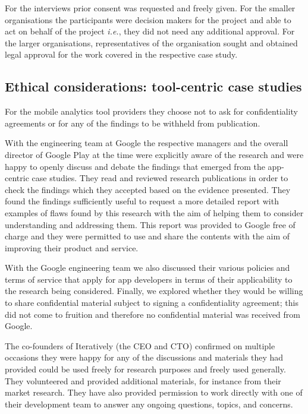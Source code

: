 For the interviews prior consent was requested and freely given. For the smaller organisations the participants were decision makers for the project and able to act on behalf of the project \textit{i.e.}, they did not need any additional approval. For the larger organisations, representatives of the organisation sought and obtained legal approval for the work covered in the respective case study.


\subsection{Ethical considerations: tool-centric case studies}
For the mobile analytics tool providers they choose not to ask for confidentiality agreements or for any of the findings to be withheld from publication. 

With the engineering team at Google the respective managers and the overall director of Google Play at the time were explicitly aware of the research and were happy to openly discuss and debate the findings that emerged from the app-centric case studies. They read and reviewed research publications in order to check the findings which they accepted based on the evidence presented. They found the findings sufficiently useful to request a more detailed report with examples of flaws found by this research with the aim of helping them to consider understanding and addressing them. This report was provided to Google free of charge and they were permitted to use and share the contents with the aim of improving their product and service.

With the Google engineering team we also discussed their various policies and terms of service that apply for app developers in terms of their applicability to the research being considered. Finally, we explored whether they would be willing to share confidential material subject to signing a confidentiality agreement; this did not come to fruition and therefore no confidential material was received from Google.

The co-founders of Iteratively (the CEO and CTO) confirmed on multiple occasions they were happy for any of the discussions and materials they had provided could be used freely for research purposes and freely used generally. They volunteered and provided additional materials, for instance from their market research. They have also provided permission to work directly with one of their development team to answer any ongoing questions, topics, and concerns.

